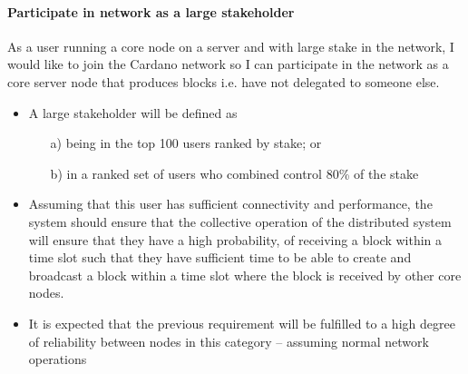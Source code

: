 \documentclass{report}
\theoremstyle{definition}{
  \newtheorem{lemma}{Lemma}[section] %
  \newtheorem{definition}[lemma]{Definition}
}
\theoremstyle{theorem}{
  \newtheorem{invariant}[lemma]{Invariant}
  \newtheorem{proofobligation}[lemma]{Proof Obligation}
}
\numberwithin{equation}{lemma}
\begin{document}
\paragraph{Participate in network as a large stakeholder}

As a user running a core node on a server and with large stake in the network,
I would like to join the Cardano network so I can participate in the network as
a core server node that produces blocks i.e. have not delegated to someone else.

\begin{itemize}
\item A large stakeholder will be defined as
      \begin{itemize}
      \item[a)] being in the top 100 users ranked by stake; or
      \item[b)] in a ranked set of users who combined control 80\% of the stake
      \end{itemize}
\item Assuming that this user has sufficient connectivity and performance, the
      system should ensure that the collective operation of the distributed
      system will ensure that they have a high probability, of receiving a
      block within a time slot such that they have sufficient time to be able
      to create and broadcast a block within a time slot where the block is
      received by other core nodes.
\item It is expected that the previous requirement will be fulfilled to a high
      degree of reliability between nodes in this category -- assuming normal
      network operations


\end{itemize}
\end{document}
